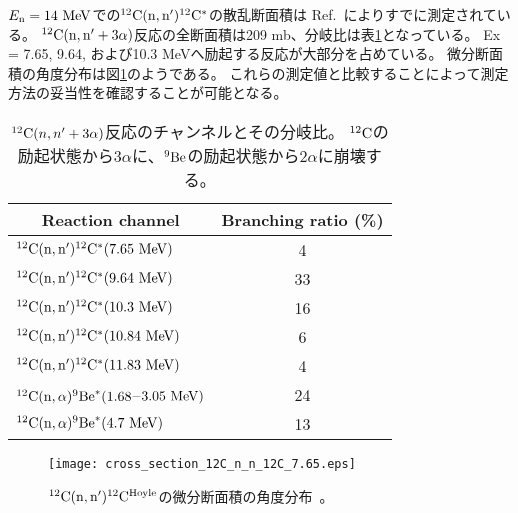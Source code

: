 \documentclass[../master]{subfiles}
\begin{document}
$E_{\rm n}=14~{\rm MeV}$での${}^{12}{\rm C}({\rm n},{\rm n}'){}^{12}{\rm C}^{*}$の散乱断面積は
Ref.~\cite{takahashietal,kondoetal}によりすでに測定されている。
${}^{12}{\rm C}({\rm n},{\rm n}'+3\alpha)$反応の全断面積は209 mb、分岐比は表\ref{tab::branchingratio}となっている。
Ex = 7.65, 9.64, および10.3 MeVへ励起する反応が大部分を占めている。
微分断面積の角度分布は図\ref{fig::sig_angle_dist}のようである。
これらの測定値と比較することによって測定方法の妥当性を確認することが可能となる。

\begin{table}
  \centering
  \caption[${}^{12}{\rm C}(n,n'+3\alpha)$反応のチャンネルとその分岐比。]
          {${}^{12}{\rm C}(n,n'+3\alpha)$反応のチャンネルとその分岐比。
  ${}^{12}{\rm C}$の励起状態から$3\alpha$に、${}^{9}{\rm Be}$の励起状態から$2\alpha$に崩壊する。}
  \label{tab::branchingratio}
  \begin{tabular}{lc}
    \toprule
    \multicolumn{1}{c}{Reaction channel} & Branching ratio (\%)\\
    \midrule
    ${}^{12}{\rm C}({\rm n},{\rm n}'){}^{12}{\rm C}^{*}(7.65~{\rm MeV})$ & 4\\
    ${}^{12}{\rm C}({\rm n},{\rm n}'){}^{12}{\rm C}^{*}(9.64~{\rm MeV})$ & 33\\
    ${}^{12}{\rm C}({\rm n},{\rm n}'){}^{12}{\rm C}^{*}(10.3~{\rm MeV})$ & 16\\
    ${}^{12}{\rm C}({\rm n},{\rm n}'){}^{12}{\rm C}^{*}(10.84~{\rm MeV})$ & 6\\
    ${}^{12}{\rm C}({\rm n},{\rm n}'){}^{12}{\rm C}^{*}(11.83~{\rm MeV})$ & 4\\
    ${}^{12}{\rm C}({\rm n},\alpha){}^{9}{\rm Be}^{*}(1.68$--$3.05~{\rm MeV})$ & 24\\
    ${}^{12}{\rm C}({\rm n},\alpha){}^{9}{\rm Be}^{*}(4.7~{\rm MeV})$ & 13\\
    \bottomrule
  \end{tabular}
\end{table}

\begin{figure}
  \centering
  \texttt{[image: cross\_section\_12C\_n\_n\_12C\_7.65.eps]}
  \caption[${}^{12}{\rm C}({\rm n},{\rm n}'){}^{12}{\rm C}^{\rm Hoyle}$の微分断面積の角度分布。]
          {${}^{12}{\rm C}({\rm n},{\rm n}'){}^{12}{\rm C}^{\rm Hoyle}$の微分断面積の角度分布~\cite{kondoetal}。}
  \label{fig::sig_angle_dist}
\end{figure}
\end{document}

